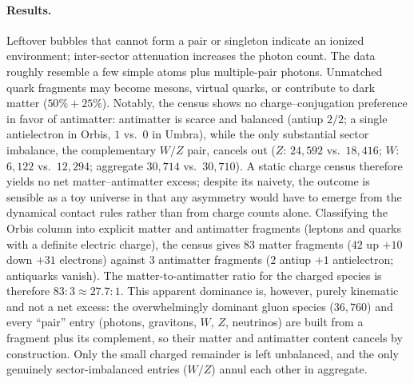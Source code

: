 \documentclass{ijuc}
\begin{document}
\paragraph{Results.} Leftover bubbles that cannot form a pair or singleton indicate an ionized environment; inter-sector attenuation increases the photon count.  The data roughly resemble a few simple atoms plus multiple-pair photons.  Unmatched quark fragments may become mesons, virtual quarks, or contribute to dark matter ($50\%+25\%$).  Notably, the census shows no charge--conjugation preference in favor of antimatter: antimatter is scarce and balanced (antiup $2/2$; a single antielectron in Orbis, $1$ vs.\ $0$ in Umbra), while the only substantial sector imbalance, the complementary $W/Z$ pair, cancels out ($Z$: $24{,}592$ vs.\ $18{,}416$; $W$: $6{,}122$ vs.\ $12{,}294$; aggregate $30{,}714$ vs.\ $30{,}710$).  A static charge census therefore yields no net matter--antimatter excess; despite its naivety, the outcome is sensible as a toy universe in that any asymmetry would have to emerge from the dynamical contact rules rather than from charge counts alone.
Classifying the Orbis column into explicit matter and antimatter fragments (leptons and quarks with a definite electric charge), the census gives $83$ matter fragments ($42$ up $+10$ down $+31$ electrons) against $3$ antimatter fragments ($2$ antiup $+1$ antielectron; antiquarks vanish).  The matter-to-antimatter ratio for the charged species is therefore $83{:}3\approx27.7{:}1$.  This apparent dominance is, however, purely kinematic and not a net excess: the overwhelmingly dominant gluon species ($36{,}760$) and every ``pair'' entry (photons, gravitons, $W$, $Z$, neutrinos) are built from a fragment plus its complement, so their matter and antimatter content cancels by construction.  Only the small charged remainder is left unbalanced, and the only genuinely sector-imbalanced entries ($W/Z$) annul each other in aggregate.
\end{document}
